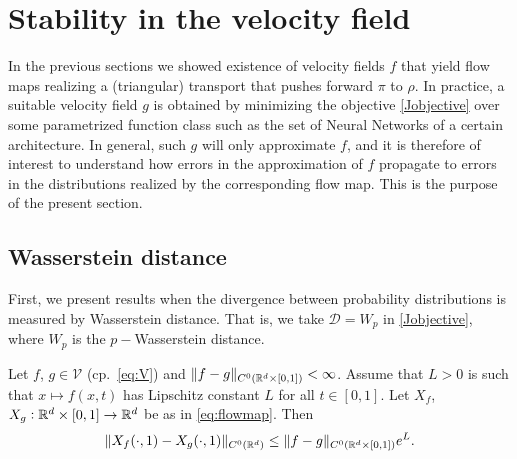 \section{Stability in the velocity field}\label{sec:DistApproximation}
In the previous sections we showed existence of velocity fields $f$
that yield flow maps realizing a (triangular) transport that pushes
forward $\pi$ to $\rho$. In practice, a suitable velocity field $g$ is
obtained by minimizing the objective \eqref{Jobjective} over some
parametrized function class such as the set of Neural Networks of a
certain architecture. In general, such $g$ will only approximate $f$,
and it is therefore of interest to understand how errors in the
approximation of $f$ propagate to errors in the distributions realized
by the corresponding flow map. This is the purpose of the present
section.


\subsection{Wasserstein distance}
First, we present results when the divergence between probability distributions is measured by Wasserstein distance. That is, we take $\mathcal{D} = W_p$ in \eqref{Jobjective}, where $W_p$ is the $p-$Wasserstein distance. 


\begin{theorem}\label{thm:FlowMapBound}
  Let $f$, $g\in\mathcal{V}$ (cp.~\eqref{eq:V}) and
  $\|f - g\|_{C^0(\mathbb{R}^d\times [0,1])}<\infty$. Assume that $L>0$ is
  such that $x\mapsto f(x,t)$ has Lipschitz constant $L$ for all
  $t\in [0,1]$.  Let $X_f$, $X_g:\mathbb{R}^d\times[0,1]\to\mathbb{R}^d$ be
  as in \eqref{eq:flowmap}.
 Then
 \begin{equation}\label{eq:FlowMapBound}
   \|X_f(\cdot,1) - X_g(\cdot,1)\|_{C^0(\mathbb{R}^d)} \leq \|f -
   g\|_{C^0(\mathbb{R}^d\times [0,1])} e^{L}.
 \end{equation}
\end{theorem}

